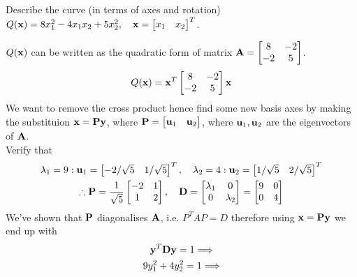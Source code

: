 \documentclass[a4paper]{article}
\numberwithin{equation}{section} %
\newcommand{\B}[1]{\textbf{\textup{#1}}} %
\begin{document}
\begin{exmp}
Describe the curve (in terms of axes and rotation) $Q(\B{x})=8x_{1}^{2}-4x_{1}x_2+5x_{2}^{2},\quad \B{x}=\begin{bmatrix}x_1 & x_2 \end{bmatrix}^T$.
\end{exmp}
\begin{TheSolution}
$Q(\B{x})$ can be written as the quadratic form of matrix $\B{A}=\begin{bmatrix}8 &-2\\-2 & 5 \end{bmatrix}$.
\[
Q(\B{x})=\B{x}^{T}\begin{bmatrix}8 &-2\\-2 & 5 \end{bmatrix}\B{x}
\]
We want to remove the cross product hence find some new basis axes by making the substituion $\B{x}=\B{Py}$, where $\B{P}=\begin{bmatrix}\B{u}_1 & \B{u}_2\end{bmatrix}$, where $\B{u}_1, \B{u}_2$ are the eigenvectors of $\B{A}$.\\
Verify that
	\[
    \begin{gathered}
      \lambda_1=9:\space \space \B{u}_1=\begin{bmatrix}-2/\sqrt{5} & 1/\sqrt{5}\end{bmatrix}^T,\quad 	\lambda_2=4: \B{u}_2=\begin{bmatrix}1/\sqrt{5} & 2/\sqrt{5}\end{bmatrix}^T\\
      \therefore \B{P}=\frac{1}{\sqrt{5}}\begin{bmatrix}-2 & 1 \\1 & 2 \end{bmatrix},\quad \B{D}=\begin{bmatrix}\lambda_1 &0  \\ 0 & \lambda_2\end{bmatrix}=\begin{bmatrix}9 & 0\\0 &4 \end{bmatrix}
    \end{gathered}
    \]
    We've shown that $\B{P}$ diagonalises $\B{A}$, i.e. $P^{T}AP=D$ therefore using $\B{x}=\B{Py}$ we end up with
	\[   
    \begin{gathered}
    \B{y}^{T}\B{Dy}=1\Longrightarrow \\
    9y_1^{2}+4y_2^{2}=1 \Longrightarrow
    \end{gathered}
\]
\end{TheSolution}
\end{document}
